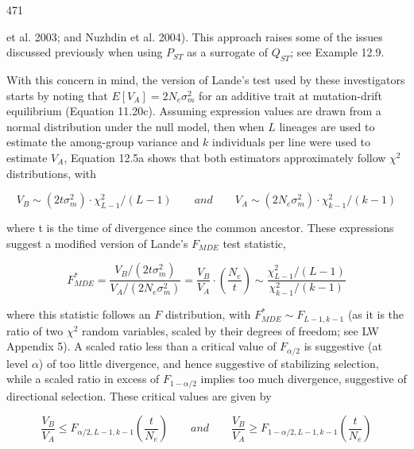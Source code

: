 \documentclass{article}
\begin{document}
471

et al. 2003; and Nuzhdin et al. 2004). This approach raises some of the issues discussed previously when using  $ P_{ST} $ as a surrogate of  $ Q_{ST} $; see Example 12.9.

With this concern in mind, the version of Lande's test used by these investigators starts by noting that  $ E[V_A] = 2N_e\sigma_m^2 $ for an additive trait at mutation-drift equilibrium (Equation 11.20c). Assuming expression values are drawn from a normal distribution under the null model, then when  $ L $ lineages are used to estimate the among-group variance and  $ k $ individuals per line were used to estimate  $ V_A $, Equation 12.5a shows that both estimators approximately follow  $ \chi^2 $ distributions, with

\begin{equation}
V_{B}\sim\left(2t\sigma_{m}^{2}\right)\cdot\chi_{L-1}^{2}/\left(L-1\right)\qquad and\qquad V_{A}\sim\left(2N_{e}\sigma_{m}^{2}\right)\cdot\chi_{k-1}^{2}/\left(k-1\right)
\tag{12.34a}
\label{eq:12_34a}
\end{equation}

where t is the time of divergence since the common ancestor. These expressions suggest a modified version of Lande's  $ F_{MDE} $ test statistic,

\begin{equation}
F_{M D E}^{*}=\frac{V_{B}/(2t\sigma_{m}^{2})}{V_{A}/(2N_{e}\sigma_{m}^{2})}=\frac{V_{B}}{V_{A}}\cdot\left(\frac{N_{e}}{t}\right)\sim\frac{\chi_{L-1}^{2}/(L-1)}{\chi_{k-1}^{2}/(k-1)}
\tag{12.34b}
\label{eq:12_34b}
\end{equation}

where this statistic follows an $F$ distribution, with $F_{MDE}^* \sim F_{L-1,k-1}$ (as it is the ratio of two $\chi^2$ random variables, scaled by their degrees of freedom; see LW Appendix 5). A scaled ratio less than a critical value of $F_{\alpha/2}$ is suggestive (at level $\alpha$) of too little divergence, and hence suggestive of stabilizing selection, while a scaled ratio in excess of $F_{1-\alpha/2}$ implies too much divergence, suggestive of directional selection. These critical values are given by

\begin{equation}
\frac{V_{B}}{V_{A}}\leq F_{\alpha/2,L-1,k-1}\left(\frac{t}{N_{e}}\right)\qquad and\qquad\frac{V_{B}}{V_{A}}\geq F_{1-\alpha/2,L-1,k-1}\left(\frac{t}{N_{e}}\right)
\tag{12.34c}
\label{eq:12_34c}
\end{equation}
\end{document}
